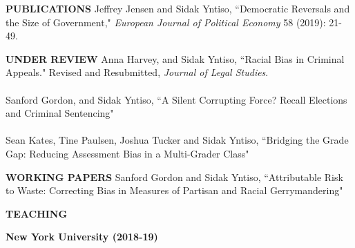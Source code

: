 \documentclass[letterpaper,11pt,oneside]{article}
\begin{document}
	\noindent\textbf{\textsc{PUBLICATIONS}
		\vspace{2mm}}
	\newline
	\noindent
	\hangindent=0.7cm {
		Jeffrey Jensen and Sidak Yntiso,  ``Democratic Reversals and the Size of Government,"  \textit{European Journal of Political Economy} 58 (2019): 21-49. \\
	}
	
	\noindent\textbf{\textsc{UNDER REVIEW}
		\vspace{2mm}}
	\newline
	\noindent
	\hangindent=0.7cm {
		Anna Harvey, and Sidak Yntiso, {``Racial Bias in Criminal Appeals." Revised and Resubmitted, \textit{Journal of Legal Studies}.} \\ \\
	}
	\hangindent=0.7cm {
		Sanford Gordon, and Sidak Yntiso, {``A Silent Corrupting Force? Recall Elections and Criminal Sentencing"} \\ \\
	}
	\hangindent=0.7cm {
		Sean Kates, Tine Paulsen, Joshua Tucker and Sidak Yntiso, {``Bridging the Grade Gap: Reducing Assessment Bias in a Multi-Grader Class"} \\
	}
	
	\noindent\textbf{\textsc{WORKING PAPERS}
		\vspace{2mm}}
	\newline
	\noindent
	\hangindent=0.7cm {
		Sanford Gordon and Sidak Yntiso, {``Attributable Risk to Waste: Correcting Bias in Measures of Partisan and Racial Gerrymandering"} \\ 
	}


	\noindent\textbf{\textsc{TEACHING}
		\vspace{-2mm}}
	\newline
	\noindent
	
	\textbf{New York University (2018-19)}\\
	\noindent
	
\end{document}
